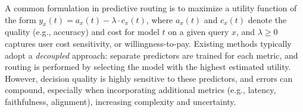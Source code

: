 \documentclass{article}
\theoremstyle{remark}
\begin{document}



A common formulation in predictive routing is to maximize a utility function of the form \( y_x(t) = a_x(t) - \lambda \cdot c_x(t) \), where \( a_x(t) \) and \( c_x(t) \) denote the quality (e.g., accuracy) and cost for model \( t \) on a given query $x$, and \( \lambda \geq 0 \) captures user cost sensitivity, or willingness-to-pay. Existing methods typically adopt a \emph{decoupled} approach: separate predictors are trained for each metric, and routing is performed by selecting the model with the highest estimated utility. However, decision quality is highly sensitive to these predictors, and errors can compound, especially when incorporating additional metrics (e.g., latency, faithfulness, alignment), increasing complexity and uncertainty.
\end{document}

